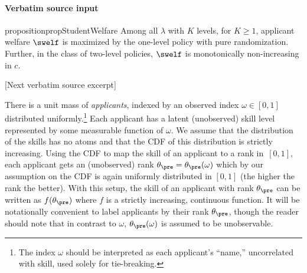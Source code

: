 \documentclass[10pt]{article}
\begin{document}
\paragraph{Verbatim source input}
\begin{ReviewVerbatim}
\begin{restatable}{proposition}{propStudentWelfare}\label{prop:student-welfare}
	Among all $\lambda$ with $K$ levels, for $K\geq 1$, applicant welfare $\swelf$ is maximized by the one-level policy with pure randomization. Further, in the class of two-level policies, $\swelf$ is monotonically non-increasing in $c$.
\end{restatable}

[Next verbatim source excerpt]

There is a unit mass of \textit{applicants}, indexed by an observed index $\omega \in [0,1]$ distributed uniformly.\footnote{The index $\omega$ should be interpreted as each applicant's ``name,'' uncorrelated with skill, used solely for tie-breaking.}  Each applicant has a latent (unobserved) skill level represented by some measurable function of $\omega$.
We assume that {the distribution of the skills} has no atoms and that the CDF of this distribution is strictly increasing.
Using the CDF to map the skill of an applicant to a rank in~$[0,1]$, each applicant gets an (unobserved) rank $\theta_\pre =\theta_\pre(\omega)$ which by our assumption on the CDF is again uniformly distributed in $[0, 1]$ (the higher the rank the better).  With this setup, the skill of an applicant with rank $\theta_\pre$ can be written as $f(\theta_\pre)$ where $f$ is a strictly increasing, continuous function.  {It will be notationally convenient to label applicants by their rank $\theta_\pre$, though the reader should note that in contrast to $\omega$, $\theta_\pre(\omega)$ is assumed to be unobservable.}




\end{ReviewVerbatim}
\end{document}
